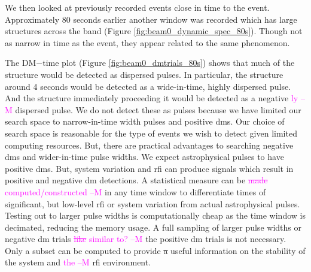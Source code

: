 \documentclass[a4paper,fleqn,usenatbib]{mnras}
\newcommand{\cM}[1]{\textcolor{magenta}{ #1 --M}}
\begin{document}
We then looked at previously recorded events close in time to the event.
Approximately 80 seconds earlier another window was recorded which has large
structures across the band (Figure \ref{fig:beam0_dynamic_spec_80s}). Though not
as narrow in time as the event, they appear related to the same phenomenon.

The DM$-$time plot (Figure \ref{fig:beam0_dmtrials_80s}) shows that much of the
structure would be detected as dispersed pulses.  In particular, the structure
around 4 seconds would be detected as a wide-in-time, highly dispersed pulse.
And the structure immediately proceeding it would be detected as a negative\cM{ly}
dispersed pulse.  We do not detect these as pulses because we have limited our
search space to narrow-in-time width pulses and positive \glspl{dm}. Our choice
of search space is reasonable for the type of events we wish to detect given
limited computing resources. But, there are practical advantages to searching
negative \glspl{dm} and wider-in-time pulse widths. We expect astrophysical
pulses to have positive \glspl{dm}. But, system variation and \gls{rfi} can
produce signals which result in positive and negative \gls{dm} detections.  A
statistical measure can be \cM{\sout{made} computed/constructed} in any time window to differentiate times of
significant, but low-level \gls{rfi} or system variation from actual
astrophysical pulses. Testing out to larger pulse widths is computationally
cheap as the time window is decimated, reducing the memory usage. A full sampling
of larger pulse widths or negative \gls{dm} trials \cM{\sout{like} similar to?} the positive \gls{dm}
trials is not necessary. Only a subset can be computed to provide \sout{a} useful
information on the stability of the system and \cM{the} \gls{rfi} environment.
\end{document}
